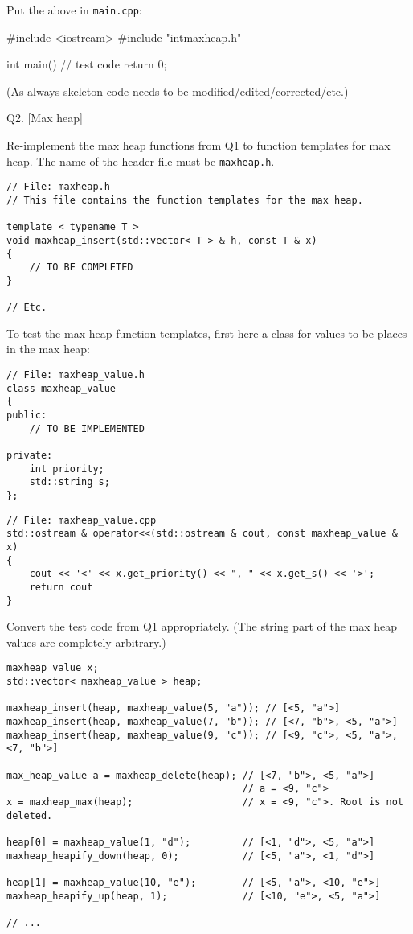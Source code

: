 Put the above in \texttt{main.cpp}:
\begin{console}
#include <iostream>
#include "intmaxheap.h"

int main()
{
    // test code
    return 0;
}
\end{console}

(As always skeleton code needs to be modified/edited/corrected/etc.)

\newpage
Q2. [Max heap]

Re-implement the max heap functions
from Q1 to function templates for max heap.
The name of the header file must be
\texttt{maxheap.h}.

\begin{Verbatim}[frame=single]
// File: maxheap.h
// This file contains the function templates for the max heap.

template < typename T >
void maxheap_insert(std::vector< T > & h, const T & x)
{
    // TO BE COMPLETED
}

// Etc.
\end{Verbatim}

To test the max heap function templates,
first here a class for values to be places in the max heap:
\begin{Verbatim}[frame=single]
// File: maxheap_value.h
class maxheap_value
{
public:
    // TO BE IMPLEMENTED
    
private:
    int priority;
    std::string s;
};
\end{Verbatim}
\begin{Verbatim}[frame=single]
// File: maxheap_value.cpp
std::ostream & operator<<(std::ostream & cout, const maxheap_value & x)
{
    cout << '<' << x.get_priority() << ", " << x.get_s() << '>';
    return cout
}
\end{Verbatim}

Convert the test code from Q1 appropriately.
(The string part of the max heap values are completely arbitrary.)

{\small
\begin{Verbatim}[frame=single]
maxheap_value x;
std::vector< maxheap_value > heap;

maxheap_insert(heap, maxheap_value(5, "a")); // [<5, "a">]
maxheap_insert(heap, maxheap_value(7, "b")); // [<7, "b">, <5, "a">]
maxheap_insert(heap, maxheap_value(9, "c")); // [<9, "c">, <5, "a">, <7, "b">]

max_heap_value a = maxheap_delete(heap); // [<7, "b">, <5, "a">]
                                         // a = <9, "c">
x = maxheap_max(heap);                   // x = <9, "c">. Root is not deleted.

heap[0] = maxheap_value(1, "d");         // [<1, "d">, <5, "a">]
maxheap_heapify_down(heap, 0);           // [<5, "a">, <1, "d">]

heap[1] = maxheap_value(10, "e");        // [<5, "a">, <10, "e">]
maxheap_heapify_up(heap, 1);             // [<10, "e">, <5, "a">]

// ...
\end{Verbatim}
}

